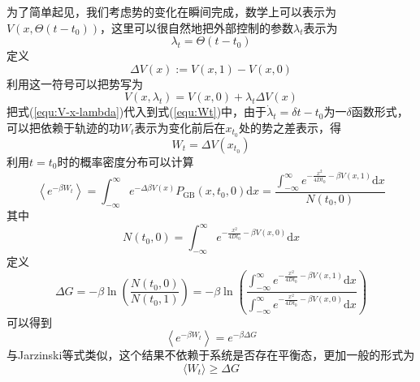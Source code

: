 为了简单起见，我们考虑势的变化在瞬间完成，数学上可以表示为$V\left(x, \Theta\left(t-t_{0}\right)\right)$，这里可以很自然地把外部控制的参数$\lambda_t$表示为
\begin{equation}
\lambda_{t}=\Theta\left(t-t_{0}\right)
\end{equation}
定义
\begin{equation}
\Delta V(x):=V(x, 1)-V(x, 0)
\end{equation}
利用这一符号可以把势写为
\begin{equation}
V\left(x, \lambda_{t}\right)=V(x, 0)+\lambda_{t} \Delta V(x)
\label{equ:V-x-lambda}
\end{equation}
把式(\ref{equ:V-x-lambda})代入到式(\ref{equ:Wt})中，由于$\dot{\lambda}_t=\delta{t-t_0}$为一$\delta$函数形式，可以把依赖于轨迹的功$W_t$表示为变化前后在$x_{t_0}$处的势之差表示，得
\begin{equation}
W_{t}=\Delta V\left(x_{t_{0}}\right)
\end{equation}
利用$t=t_0$时的概率密度分布可以计算
\begin{equation}
\left\langle e^{-\beta W_{t}}\right\rangle=\int_{-\infty}^{\infty} e^{-\Delta \beta V(x)} P_{\mathrm{GB}}\left(x, t_{0}, 0\right) \mathrm{d} x=\frac{\int_{-\infty}^{\infty} e^{-\frac{x^{2}}{4 D t_{0}}-\beta V(x, 1)} \mathrm{d} x}{N\left(t_{0}, 0\right)}
\end{equation}
其中
\begin{equation}
N(t_0,0)=\int_{-\infty}^{\infty} e^{-\frac{x^{2}}{4 D t_{0}}-\beta V(x, 0)} \mathrm{d} x
\end{equation}
定义
\begin{equation}
\Delta G=-\beta \ln \left(\frac{N\left(t_{0}, 0\right)}{N\left(t_{0}, 1\right)}\right)=-\beta \ln \left(\frac{\int_{-\infty}^{\infty} e^{-\frac{x^{2}}{4 D t_{0}}-\beta V(x, 1)} \mathrm{d} x}{\int_{-\infty}^{\infty} e^{-\frac{x^{2}}{4 D t_{0}}-\beta V(x, 0)} \mathrm{d} x}\right)
\end{equation}
可以得到
\begin{equation}
\left\langle e^{-\beta W_{t}}\right\rangle=e^{-\beta \Delta G}
\end{equation}
与Jarzinski等式类似，这个结果不依赖于系统是否存在平衡态，更加一般的形式为
\begin{equation}
\langle W_{t}\rangle\geqslant\Delta G
\end{equation}